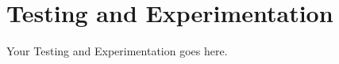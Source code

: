 \section{Testing and Experimentation}\label{sec:testing-and-experimentation}

Your Testing and Experimentation goes here.